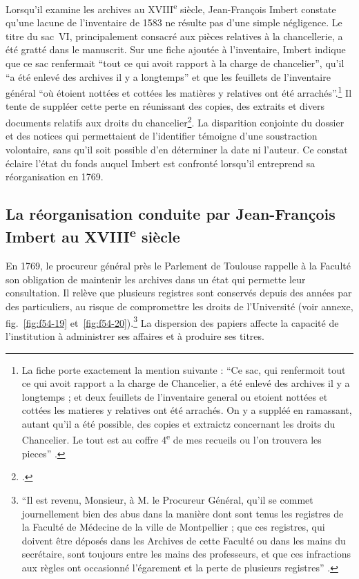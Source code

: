 Lorsqu'il examine les archives au XVIII\textsuperscript{e} siècle, Jean-François Imbert constate qu'une lacune de l'inventaire de 1583 ne résulte pas d'une simple négligence. Le titre du sac~VI, principalement consacré aux pièces relatives à la chancellerie, a été gratté dans le manuscrit. Sur une fiche ajoutée à l'inventaire, Imbert indique que ce sac renfermait \enquote{tout ce qui avoit rapport à la charge de chancelier}, qu'il \enquote{a été enlevé des archives il y a longtemps} et que les feuillets de l'inventaire général \enquote{où étoient nottées et cottées les matières y relatives ont été arrachés}.\footnote{La fiche porte exactement la mention suivante : \enquote{Ce sac, qui renfermoit tout ce qui avoit rapport a la charge de Chancelier, a été enlevé des archives il y a longtemps ; et deux feuillets de l'inventaire general ou etoient nottées et cottées les matieres y relatives ont été arrachés. On y a suppléé en ramassant, autant qu'il a été possible, des copies et extraictz concernant les droits du Chancelier. Le tout est au coffre 4\textsuperscript{e} de mes recueils ou l'on trouvera les pieces} \parencite[p.~XXIV--XXV, vues~46 à 47 de la version numérisée]{CalmetteCartulaire1912}.} Il tente de suppléer cette perte en réunissant des copies, des extraits et divers documents relatifs aux droits du chancelier\footcite{AHFMQ1}. La disparition conjointe du dossier et des notices qui permettaient de l'identifier témoigne d'une soustraction volontaire, sans qu'il soit possible d'en déterminer la date ni l'auteur. Ce constat éclaire l'état du fonds auquel Imbert est confronté lorsqu'il entreprend sa réorganisation en 1769.

\subsection{La réorganisation conduite par Jean-François Imbert au XVIII\textsuperscript{e} siècle}

En 1769, le procureur général près le Parlement de Toulouse rappelle à la Faculté son obligation de maintenir les archives dans un état qui permette leur consultation. Il relève que plusieurs registres sont conservés depuis des années par des particuliers, au risque de compromettre les droits de l'Université (voir annexe, fig.~\ref{fig:f54-19} et~\ref{fig:f54-20}).\footnote{\enquote{Il est revenu, Monsieur, à M. le Procureur Général, qu'il se commet journellement bien des abus dans la manière dont sont tenus les registres de la Faculté de Médecine de la ville de Montpellier ; que ces registres, qui doivent être déposés dans les Archives de cette Faculté ou dans les mains du secrétaire, sont toujours entre les mains des professeurs, et que ces infractions aux règles ont occasionné l'égarement et la perte de plusieurs registres} \parencite{AHFMF54}.} La dispersion des papiers affecte la capacité de l'institution à administrer ses affaires et à produire ses titres.

